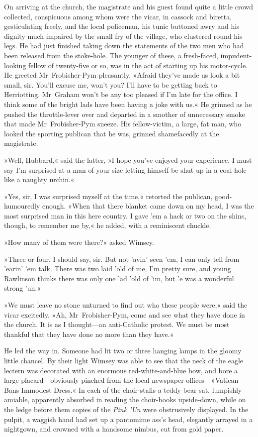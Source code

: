 On arriving at the church, the magistrate and his guest found quite a little crowd collected, conspicuous among whom were the vicar, in cassock and biretta, gesticulating freely, and the local policeman, his tunic buttoned awry and his dignity much impaired by the small fry of the village, who clustered round his legs. He had just finished taking down the statements of the two men who had been released from the stoke-hole. The younger of these, a fresh-faced, impudent-looking fellow of twenty-five or so, was in the act of starting up his motor-cycle. He greeted Mr~Frobisher-Pym pleasantly. »Afraid they've made us look a bit small, sir. You'll excuse me, won't you? I'll have to be getting back to Herriotting. Mr~Graham won't be any too pleased if I'm late for the office. I think some of the bright lads have been having a joke with us.« He grinned as he pushed the throttle-lever over and departed in a smother of unnecessary smoke that made Mr~Frobisher-Pym sneeze. His fellow-victim, a large, fat man, who looked the sporting publican that he was, grinned shamefacedly at the magistrate.

»Well, Hubbard,« said the latter, »I hope you've enjoyed your experience. I must say I'm surprised at a man of your size letting himself be shut up in a coal-hole like a naughty urchin.«

»Yes, sir, I was surprised myself at the time,« retorted the publican, good-humouredly enough. »When that there blanket came down on my head, I was the most surprised man in this here country. I gave 'em a hack or two on the shins, though, to remember me by,« he added, with a reminiscent chuckle.

»How many of them were there?« asked Wimsey.

»Three or four, I should say, sir. But not 'avin' seen 'em, I can only tell from 'earin' 'em talk. There was two laid 'old of me, I'm pretty sure, and young Rawlinson thinks there was only one 'ad 'old of 'im, but 'e was a wonderful strong 'un.«

»We must leave no stone unturned to find out who these people were,« said the vicar excitedly. »Ah, Mr~Frobisher-Pym, come and see what they have done in the church. It is as I thought—an anti-Catholic protest. We must be most thankful that they have done no more than they have.«

He led the way in. Someone had lit two or three hanging lamps in the gloomy little chancel. By their light Wimsey was able to see that the neck of the eagle lectern was decorated with an enormous red-white-and-blue bow, and bore a large placard—obviously pinched from the local newspaper offices—»Vatican Bans Immodest Dress.« In each of the choir-stalls a teddy-bear sat, lumpishly amiable, apparently absorbed in reading the choir-books upside-down, while on the ledge before them copies of the \textit{Pink 'Un} were obstrusively displayed. In the pulpit, a waggish hand had set up a pantomime ass's head, elegantly arrayed in a nightgown, and crowned with a handsome nimbus, cut from gold paper.

